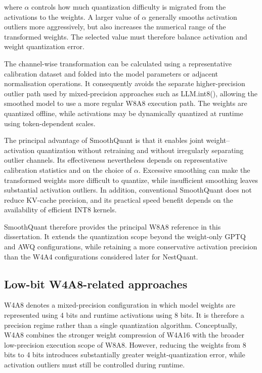 where \(\alpha\) controls how much quantization difficulty is migrated
from the activations to the weights. A larger value of \(\alpha\)
generally smooths activation outliers more aggressively, but also
increases the numerical range of the transformed weights. The selected
value must therefore balance activation and weight quantization error.

The channel-wise transformation can be calculated using a representative
calibration dataset and folded into the model parameters or adjacent
normalisation operations. It consequently avoids the separate
higher-precision outlier path used by mixed-precision approaches such as
LLM.int8(), allowing the smoothed model to use a more regular W8A8
execution path. The weights are quantized offline, while activations may
be dynamically quantized at runtime using token-dependent scales.

The principal advantage of SmoothQuant is that it enables joint
weight--activation quantization without retraining and without
irregularly separating outlier channels. Its effectiveness nevertheless
depends on representative calibration statistics and on the choice of
\(\alpha\). Excessive smoothing can make the transformed weights more
difficult to quantize, while insufficient smoothing leaves substantial
activation outliers. In addition, conventional SmoothQuant does not
reduce KV-cache precision, and its practical speed benefit depends on
the availability of efficient INT8 kernels.

SmoothQuant therefore provides the principal W8A8 reference in this
dissertation. It extends the quantization scope beyond the weight-only
GPTQ and AWQ configurations, while retaining a more conservative
activation precision than the W4A4 configurations considered later for
NestQuant.

\subsection{Low-bit \ac{W4A8}-related approaches}
\ac{W4A8} denotes a mixed-precision configuration in which model
weights are represented using 4 bits and runtime activations using
8 bits. It is therefore a precision regime rather than a single
quantization algorithm. Conceptually, W4A8 combines the stronger
weight compression of W4A16 with the broader low-precision execution
scope of W8A8. However, reducing the weights from 8 bits to 4 bits
introduces substantially greater weight-quantization error, while
activation outliers must still be controlled during runtime.

